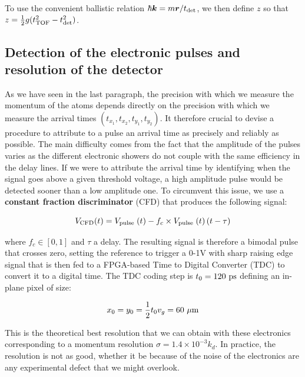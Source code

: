 \noindent To use the convenient ballistic relation $\hbar \bm{k} = m \bm{r}/t_{\rm{det}}$, we then define $z$ so that $z=\frac{1}{2} g(t_{\rm{TOF}}^2-t_{\rm{det}}^2)$.

\subsection{Detection of the electronic pulses and resolution of the detector}

As we have seen in the last paragraph, the precision with which we measure the momentum of the atoms depends directly on the precision with which we measure the arrival times $(t_{x_1},t_{x_2},t_{y_1},t_{y_2})$. It therefore crucial to devise a procedure to attribute to a pulse an arrival time as precisely and reliably as possible. The main difficulty comes from the fact that the amplitude of the pulses varies as the different electronic showers do not couple with the same efficiency in the delay lines. If we were to attribute the arrival time by identifying when the signal goes above a given threshold voltage, a high amplitude pulse would be detected sooner than a low amplitude one. To circumvent this issue, we use a \textbf{constant fraction discriminator} (CFD) that produces the following signal:

\begin{equation}
    V_{\rm{CFD}}(t)=V_{\text {pulse }}(t)-f_{c} \times V_{\text {pulse }}(t)\left(t-\tau\right)
\end{equation}

\noindent where $f_c \in [0,1]$ and $\tau$ a delay. The resulting signal is therefore a bimodal pulse that crosses zero, setting the reference to trigger a 0-1V with sharp raising edge signal that is then fed to a FPGA-based Time to Digital Converter (TDC) to convert it to a digital time. The TDC coding step is $t_0 = 120 \ \rm{ps}$ defining an in-plane pixel of size:

\begin{equation}
    x_0 = y_0 = \frac{1}{2} t_0 v_g = 60 \ \mu \rm{m}
\end{equation}

 \noindent This is the theoretical best resolution that we can obtain with these electronics corresponding to a momentum resolution $\sigma = 1.4 \times 10^{-3} k_d$. In practice, the resolution is not as good, whether it be because of the noise of the electronics are any experimental defect that we might overlook.
 
